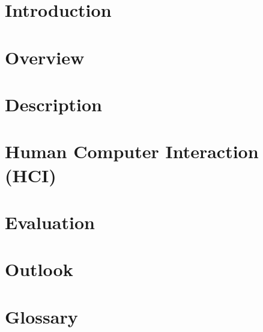 \documentclass[a4paper]{article}
\begin{document}
	
	
	
	\clearpage
	
	\tableofcontents
	\clearpage
	
	\section{Introduction}
	
	
	\section{Overview}
	
		
	\section{Description}
	
		
	\section{Human Computer Interaction (HCI)}
	
		
	\section{Evaluation}
	
		
	\section{Outlook}
	
	
	\section{Glossary}
	
	
	\clearpage
	{}
	
	
\end{document}
